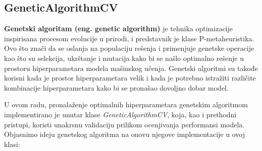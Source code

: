 \documentclass{article}
\begin{document}
\subsection{GeneticAlgorithmCV}
\vspace{0.25 cm}
\textbf{Genetski algoritam (eng. genetic algorithm)} je tehnika optimizacije inspirisana procesom evolucije u prirodi, i predstavnik je klase P-metaheuristika. Ovo što znači da se oslanja na populaciju rešenja i primenjuje genetske operacije kao što su selekcija, ukrštanje i mutacija kako bi se našlo optimalno rešenje u prostoru hiperparametara modela mašinskog učenja. Genetski algoritmi su takođe korisni kada je prostor hiperparametara velik i kada je potrebno istražiti različite kombinacije hiperparametara kako bi se pronašao dovoljno dobar model.\newline

\noindent U ovom radu, pronalaženje optimalnih hiperparametara genetskim algoritmom implementirano je unutar klase \textit{GeneticAlgorithmCV}, koja, kao i prethodni pristupi, koristi unakrsnu validaciju prilikom ocenjivanja performansi modela. Objasnimo ideju genetskog algoritma na onovu njegove implementacije u ovoj klasi:
\end{document}
